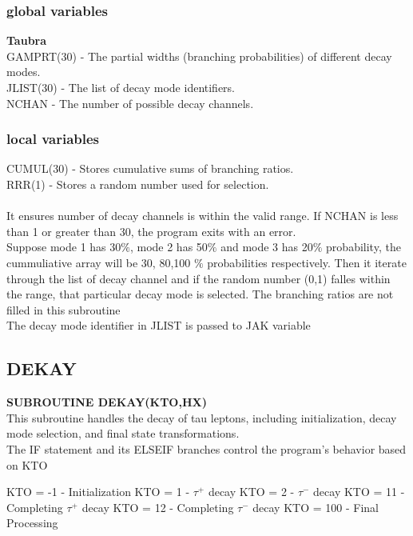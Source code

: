 \documentclass[12pt]{article}
\begin{document}
\subsubsection{global variables}
{\textbf{Taubra}\\
GAMPRT(30) - The partial widths (branching probabilities) of different decay modes.\\
JLIST(30) - The list of decay mode identifiers.\\
NCHAN - The number of possible decay channels.\\}

\subsubsection{local variables}
{CUMUL(30) - Stores cumulative sums of branching ratios.\\
RRR(1) - Stores a random number used for selection.\\
}\\
It ensures number of decay channels is within the valid range. If NCHAN is less than 1 or greater than 30, the program exits with an error.\\

Suppose mode 1 has 30$\%$, mode 2 has 50$\%$ and mode 3 has 20$\%$ probability, the cummuliative array will be 30, 80,100 $\%$ probabilities respectively. Then it iterate through the list of decay channel and if the random number (0,1) falles within the range, that particular decay mode is selected. The branching ratios are not filled in this subroutine\\

The decay mode identifier in JLIST is passed to JAK variable

\subsection{DEKAY}
\textbf{SUBROUTINE DEKAY(KTO,HX)}\\
This subroutine handles the decay of tau leptons, including initialization, decay mode selection, and final state transformations. \\

The IF statement and its ELSEIF branches control the program's behavior based on KTO

KTO = -1  - Initialization
KTO = 1   - $\tau^+$ decay
KTO = 2   - $\tau^-$ decay
KTO = 11  - Completing $\tau^+$ decay
KTO = 12  - Completing $\tau^-$ decay
KTO = 100 - Final Processing
\end{document}
